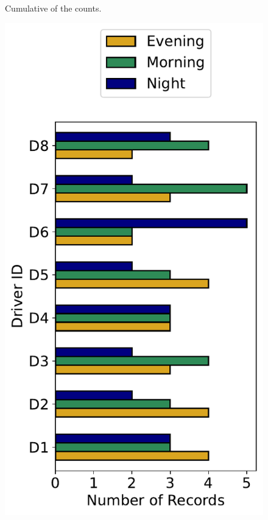 \begin{figure}
\begin{minipage}{0.49\textwidth}
        \caption[Cumulative of the observation counts.]
        {Cumulative of the counts.}
        \label{fig:tracking_cum_distribution}
    \end{minipage}
\end{figure}


\begin{figure}[h]
    \centering
    \begin{minipage}{0.33\textwidth}
        \centering
        \includegraphics[width=\textwidth]{images/dreyeve/time_distrib.pdf}

\end{minipage}
\end{figure}
